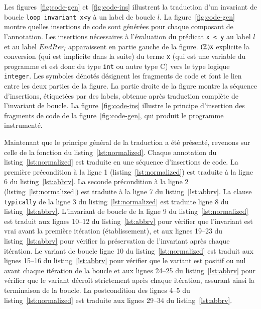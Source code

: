 



Les figures~\ref{fig:code-gen} et~\ref{fig:code-ins} illustrent la traduction
d'un invariant de boucle \lstinline'loop invariant x<y' à un label de boucle
$l$.
La figure~\ref{fig:code-gen} montre quelles insertions de code sont générées
pour chaque composant de l'annotation.
Les insertions nécessaires à l'évaluation du prédicat \lstinline'x < y' au
label $l$ et au label $\mathit{EndIter_l}$ apparaissent en partie gauche de la
figure.
$(\mathbb{Z})\mbox{\lstinline'x'}$ explicite la conversion (qui est implicite
dans la suite) du terme \lstinline'x' (qui est une variable du programme et est
donc du type \lstinline'int' ou autre type C) vers le type logique
\lstinline'integer'.
Les symboles dénotés 
désignent les fragments de code et font le lien entre les deux parties de la
figure.
La partie droite de la figure montre la séquence d'insertions, étiquetées par
des labels, obtenue après traduction complète de l'invariant de boucle.
La figure~\ref{fig:code-ins} illustre le principe d'insertion des fragments de
code de la figure~\ref{fig:code-gen}, qui produit le programme instrumenté.


Maintenant que le principe général de la traduction a été présenté, revenons
sur celle de la fonction du listing~\ref{lst:normalized}.
Chaque annotation du listing~\ref{lst:normalized} est traduite en une séquence
d'insertions de code.
La première précondition à la ligne 1 (listing~\ref{lst:normalized}) est
traduite à la ligne 6 du listing~\ref{lst:abbrv}.
La seconde précondition à la ligne 2 (listing~\ref{lst:normalized}) est
traduite à la ligne 7 du listing~\ref{lst:abbrv}.
La clause \lstinline'typically' de la ligne 3 du listing~\ref{lst:normalized}
est traduite ligne 8 du listing~\ref{lst:abbrv}.
L'invariant de boucle de la ligne 9 du listing~\ref{lst:normalized} est traduit
aux lignes 10--12 du listing~\ref{lst:abbrv} pour vérifier que l'invariant est
vrai avant la première itération (établissement), et aux lignes 19--23 du
listing~\ref{lst:abbrv} pour vérifier la préservation de l'invariant après
chaque itération.
Le variant de boucle ligne 10 du listing~\ref{lst:normalized} est traduit aux
lignes 15--16 du listing~\ref{lst:abbrv} pour vérifier que le variant est
positif ou nul avant chaque itération de la boucle et aux lignes 24--25 du
listing~\ref{lst:abbrv} pour vérifier que le
variant décroît strictement après chaque itération, assurant ainsi la
terminaison de la boucle.
La postcondition des lignes 4--5 du listing~\ref{lst:normalized} est traduite
aux lignes 29--34 du listing~\ref{lst:abbrv}.

